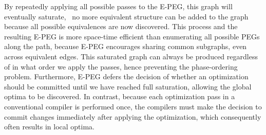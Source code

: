 By repeatedly applying all possible passes to the E-PEG, this graph will
eventually saturate, \ie~no more equivalent structure can be added to the graph
because all possible equivalences are now discovered.  This process and the
resulting E-PEG is more space-time efficient than enumerating all possible PEGs
along the path, because E-PEG encourages sharing common subgraphs, even across
equivalent edges.  This saturated graph can always be produced regardless of in
what order we apply the passes, hence preventing the phase-ordering problem.
Furthermore, E-PEG defers the decision of whether an optimization should be
committed until we have reached full saturation, allowing the global optima to
be discovered.  In contrast, because each optimization pass in a conventional
compiler is performed once, the compilers must make the decision to commit
changes immediately after applying the optimization, which consequently often
results in local optima.
